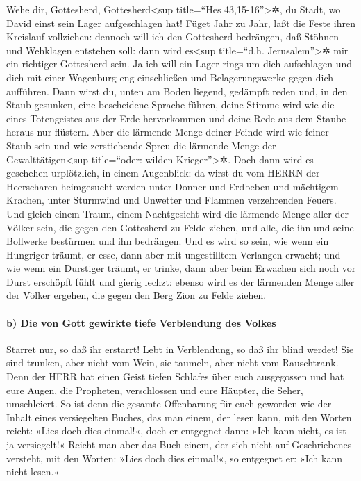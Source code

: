 Wehe dir, Gottesherd, Gottesherd\textless sup title=``Hes
43,15-16''\textgreater✲, du Stadt, wo David einst sein Lager
aufgeschlagen hat! Füget Jahr zu Jahr, laßt die Feste ihren Kreislauf
vollziehen: dennoch will ich den Gottesherd bedrängen, daß
Stöhnen und Wehklagen entstehen soll: dann wird es\textless sup
title=``d.h. Jerusalem''\textgreater✲ mir ein richtiger Gottesherd sein.
Ja ich will ein Lager rings um dich aufschlagen und dich
mit einer Wagenburg eng einschließen und Belagerungswerke gegen dich
aufführen. Dann wirst du, unten am Boden liegend, gedämpft
reden und, in den Staub gesunken, eine bescheidene Sprache führen, deine
Stimme wird wie die eines Totengeistes aus der Erde hervorkommen und
deine Rede aus dem Staube heraus nur flüstern. Aber die
lärmende Menge deiner Feinde wird wie feiner Staub sein und wie
zerstiebende Spreu die lärmende Menge der Gewalttätigen\textless sup
title=``oder: wilden Krieger''\textgreater✲. Doch dann wird es geschehen
urplötzlich, in einem Augenblick: da wirst du vom HERRN
der Heerscharen heimgesucht werden unter Donner und Erdbeben und
mächtigem Krachen, unter Sturmwind und Unwetter und Flammen verzehrenden
Feuers. Und gleich einem Traum, einem Nachtgesicht wird
die lärmende Menge aller der Völker sein, die gegen den Gottesherd zu
Felde ziehen, und alle, die ihn und seine Bollwerke bestürmen und ihn
bedrängen. Und es wird so sein, wie wenn ein Hungriger
träumt, er esse, dann aber mit ungestilltem Verlangen erwacht; und wie
wenn ein Durstiger träumt, er trinke, dann aber beim Erwachen sich noch
vor Durst erschöpft fühlt und gierig lechzt: ebenso wird es der
lärmenden Menge aller der Völker ergehen, die gegen den Berg Zion zu
Felde ziehen.

\hypertarget{b-die-von-gott-gewirkte-tiefe-verblendung-des-volkes}{%
\paragraph{b) Die von Gott gewirkte tiefe Verblendung des
Volkes}\label{b-die-von-gott-gewirkte-tiefe-verblendung-des-volkes}}

Starret nur, so daß ihr erstarrt! Lebt in Verblendung, so
daß ihr blind werdet! Sie sind trunken, aber nicht vom Wein, sie
taumeln, aber nicht vom Rauschtrank. Denn der HERR hat
einen Geist tiefen Schlafes über euch ausgegossen und hat eure Augen,
die Propheten, verschlossen und eure Häupter, die Seher, umschleiert.
So ist denn die gesamte Offenbarung für euch geworden wie
der Inhalt eines versiegelten Buches, das man einem, der lesen kann, mit
den Worten reicht: »Lies doch dies einmal!«, doch er entgegnet dann:
»Ich kann nicht, es ist ja versiegelt!« Reicht man aber
das Buch einem, der sich nicht auf Geschriebenes versteht, mit den
Worten: »Lies doch dies einmal!«, so entgegnet er: »Ich kann nicht
lesen.«

